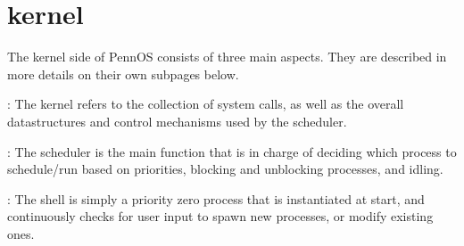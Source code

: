 \chapter{kernel}
\hypertarget{md_doc_2kernel}{}\label{md_doc_2kernel}
The kernel side of Penn\+OS consists of three main aspects. They are described in more details on their own subpages below.
\begin{DoxyEnumerate}
\item {}\+: The kernel refers to the collection of system calls, as well as the overall datastructures and control mechanisms used by the scheduler.
\item {}\+: The scheduler is the main function that is in charge of deciding which process to schedule/run based on priorities, blocking and unblocking processes, and idling.
\item {}\+: The shell is simply a priority zero process that is instantiated at start, and continuously checks for user input to spawn new processes, or modify existing ones. 
\end{DoxyEnumerate}